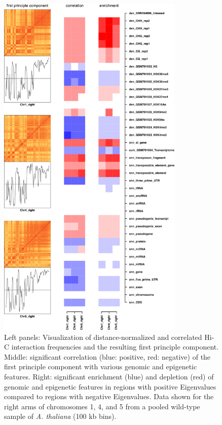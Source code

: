 \documentclass[a4paper,10pt]{article}
\begin{document}
\clearpage
\begin{figure}[!ht]
\begin{center}
\centering
\includegraphics[width=3.5in]{PCA.png}
\end{center}
\caption{Left panels: Visualization of distance-normalized and correlated Hi-C interaction frequencies and the resulting first principle component. Middle: significant correlation (blue: positive, red: negative) of the first principle component with various genomic and epigenetic features. Right: significant enrichment (blue) and depletion (red) of genomic and epigenetic features in regions with positive Eigenvalues compared to regions with negative Eigenvalues. Data shown for the right arms of chromosomes 1, 4, and 5 from a pooled wild-type sample of \textit{A. thaliana} \cite{2012_Moissiard,2014_Grob} (100 kb bins).}
\label{PCA}
\end{figure}
\clearpage
\end{document}
